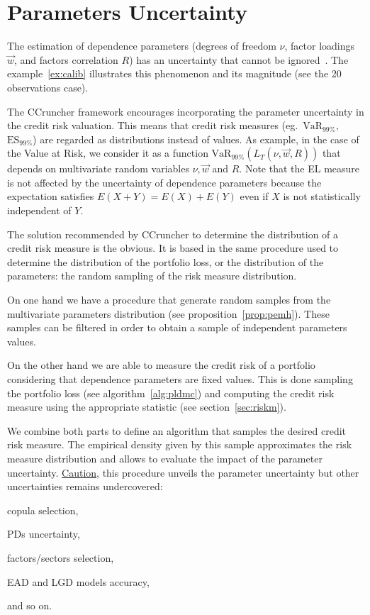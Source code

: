 \documentclass[11pt,fleqn]{book} %
\begin{document}
\section{Parameters Uncertainty}

The estimation of dependence parameters (degrees of freedom $\nu$, factor
loadings $\vec{w}$, and factors correlation $R$) has an uncertainty that 
cannot be ignored~\cite{tarashev:2010,gossl:2005}. The example~\ref{ex:calib} 
illustrates this phenomenon and its magnitude (see the 20 observations case).

The CCruncher framework encourages incorporating the parameter uncertainty 
in the credit risk valuation. This means that credit risk measures
(eg.\ $\text{VaR}_{99\%}$, $\text{ES}_{99\%}$) are regarded as distributions 
instead of values. As example, in the case of the Value at Risk, we 
consider it as a function $\text{VaR}_{99\%}(L_T(\nu,\vec{w},R))$ that 
depends on multivariate random variables $\nu, \vec{w}$ and $R$.
Note that the EL measure is not affected by the uncertainty of dependence 
parameters because the expectation satisfies $E(X+Y)=E(X)+E(Y)$ even if $X$ 
is not statistically independent of $Y$.

The solution recommended by CCruncher to determine the distribution of a
credit risk measure is the obvious. It is based in the same procedure 
used to determine the distribution of the portfolio loss, or the distribution 
of the parameters: the random sampling of the risk measure distribution. 

On one hand we have a procedure that generate random samples from the 
multivariate parameters distribution (see proposition~\ref{prop:pemh}).
These samples can be filtered in order to obtain a sample of independent
parameters values.

On the other hand we are able to measure the credit risk of a portfolio 
considering that dependence parameters are fixed values. This is done 
sampling the portfolio loss (see algorithm~\ref{alg:pldmc}) and computing 
the credit risk measure using the appropriate statistic (see 
section~\ref{sec:riskm}).

We combine both parts to define an algorithm that samples the desired
credit risk measure. The empirical density given by this sample 
approximates the risk measure distribution and allows to evaluate the 
impact of the parameter uncertainty. \ul{Caution}, this procedure unveils 
the parameter uncertainty but other uncertainties remains undercovered:
\begin{inparaenum}[1)]
	\item copula selection, 
	\item PDs uncertainty,
	\item factors/sectors selection,
	\item EAD and LGD models accuracy,
	\item and so on.
\end{inparaenum}
\end{document}

